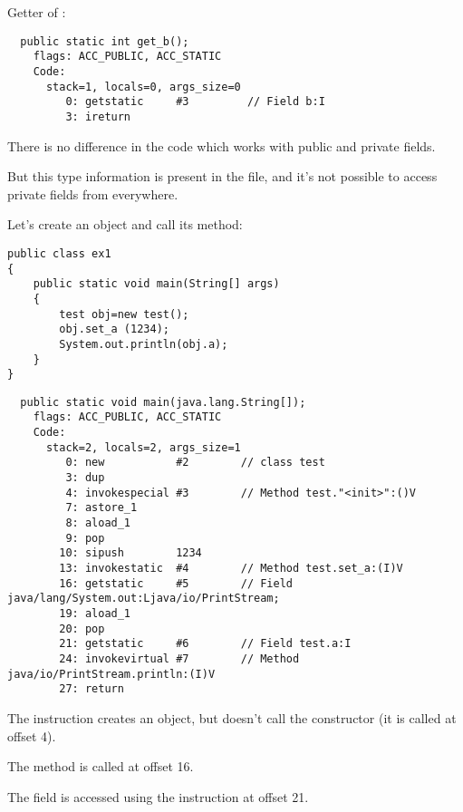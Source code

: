 Getter of :

\begin{lstlisting}
  public static int get_b();
    flags: ACC_PUBLIC, ACC_STATIC
    Code:
      stack=1, locals=0, args_size=0
         0: getstatic     #3         // Field b:I
         3: ireturn       
\end{lstlisting}

There is no difference in the code which works with public and private fields.

But this type information is present in the  file, 
and it's not possible to access private fields from everywhere.


Let's create an object and call its method:


\begin{lstlisting}[caption=ex1.java,style=customjava]
public class ex1
{
	public static void main(String[] args)
	{
		test obj=new test();
		obj.set_a (1234);
		System.out.println(obj.a);
	}
}
\end{lstlisting}

\begin{lstlisting}
  public static void main(java.lang.String[]);
    flags: ACC_PUBLIC, ACC_STATIC
    Code:
      stack=2, locals=2, args_size=1
         0: new           #2        // class test
         3: dup           
         4: invokespecial #3        // Method test."<init>":()V
         7: astore_1      
         8: aload_1       
         9: pop           
        10: sipush        1234
        13: invokestatic  #4        // Method test.set_a:(I)V
        16: getstatic     #5        // Field java/lang/System.out:Ljava/io/PrintStream;
        19: aload_1       
        20: pop           
        21: getstatic     #6        // Field test.a:I
        24: invokevirtual #7        // Method java/io/PrintStream.println:(I)V
        27: return        
\end{lstlisting}

The  instruction creates an object, but doesn't call the constructor (it is called at offset 4).

The  method is called at offset 16.

The  field is accessed using the  instruction at offset 21.

